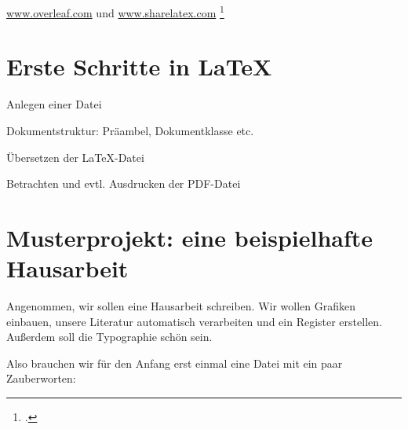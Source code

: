 \url{www.overleaf.com}  und \url{www.sharelatex.com} 
\footcite{meyer:dtk2015/1}



\section{Erste Schritte in \LaTeX}

Anlegen einer Datei

Dokumentstruktur: Präambel, Dokumentklasse etc.

Übersetzen der \LaTeX{}-Datei

Betrachten und evtl. Ausdrucken der PDF-Datei


\section{Musterprojekt: eine beispielhafte Hausarbeit}

Angenommen, wir sollen eine Hausarbeit schreiben.
Wir wollen Grafiken einbauen, unsere Literatur automatisch verarbeiten und ein Register erstellen.
Außerdem soll die Typographie schön sein.

Also brauchen wir für den Anfang erst einmal eine Datei mit ein paar Zauberworten:




